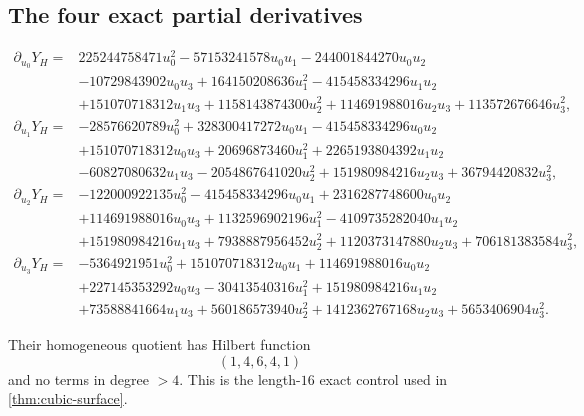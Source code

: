 \subsection{The four exact partial derivatives}

\begin{align*}
\partial_{u_0}Y_H={}&
225244758471u_0^2-57153241578u_0u_1-244001844270u_0u_2\\
&-10729843902u_0u_3+164150208636u_1^2-415458334296u_1u_2\\
&+151070718312u_1u_3+1158143874300u_2^2
+114691988016u_2u_3+113572676646u_3^2,\\[2mm]
\partial_{u_1}Y_H={}&
-28576620789u_0^2+328300417272u_0u_1-415458334296u_0u_2\\
&+151070718312u_0u_3+20696873460u_1^2+2265193804392u_1u_2\\
&-60827080632u_1u_3-2054867641020u_2^2
+151980984216u_2u_3+36794420832u_3^2,\\[2mm]
\partial_{u_2}Y_H={}&
-122000922135u_0^2-415458334296u_0u_1+2316287748600u_0u_2\\
&+114691988016u_0u_3+1132596902196u_1^2
-4109735282040u_1u_2\\
&+151980984216u_1u_3+7938887956452u_2^2
+1120373147880u_2u_3+706181383584u_3^2,\\[2mm]
\partial_{u_3}Y_H={}&
-5364921951u_0^2+151070718312u_0u_1+114691988016u_0u_2\\
&+227145353292u_0u_3-30413540316u_1^2
+151980984216u_1u_2\\
&+73588841664u_1u_3+560186573940u_2^2
+1412362767168u_2u_3+5653406904u_3^2.
\end{align*}

Their homogeneous quotient has Hilbert function
\[
 (1,4,6,4,1)
\]
and no terms in degree \(>4\).  This is the length-\(16\) exact control
used in \cref{thm:cubic-surface}.
